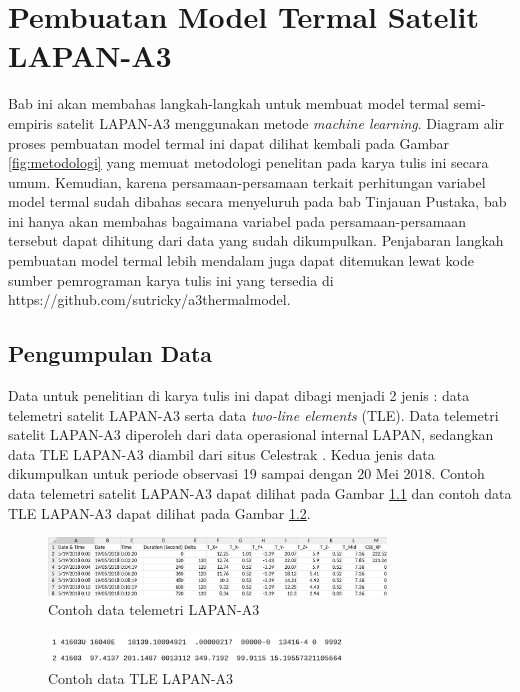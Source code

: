 \chapter{Pembuatan Model Termal Satelit LAPAN-A3}

Bab ini akan membahas langkah-langkah untuk membuat model termal semi-empiris
satelit LAPAN-A3 menggunakan metode \textit{machine learning}. Diagram alir
proses pembuatan model termal ini dapat dilihat kembali pada Gambar
\ref{fig:metodologi} yang memuat metodologi penelitan pada karya tulis ini
secara umum. Kemudian, karena persamaan-persamaan terkait perhitungan variabel
model termal sudah dibahas secara menyeluruh pada bab Tinjauan Pustaka, bab ini
hanya akan membahas bagaimana variabel pada persamaan-persamaan tersebut dapat
dihitung dari data yang sudah dikumpulkan. Penjabaran langkah pembuatan model
termal lebih mendalam juga dapat ditemukan lewat kode sumber pemrograman karya
tulis ini yang tersedia di https://github.com/sutricky/a3thermalmodel.

\section{Pengumpulan Data}

Data untuk penelitian di karya tulis ini dapat dibagi menjadi 2 jenis : data
telemetri satelit LAPAN-A3 serta data \textit{two-line elements} (TLE). Data
telemetri satelit LAPAN-A3 diperoleh dari data operasional internal LAPAN,
sedangkan data TLE LAPAN-A3 diambil dari situs Celestrak \cite{kelso}. Kedua
jenis data dikumpulkan untuk periode observasi 19 sampai dengan 20 Mei 2018.
Contoh data telemetri satelit LAPAN-A3 dapat dilihat pada Gambar
\ref{fig:telea3} dan contoh data TLE LAPAN-A3 dapat dilihat pada Gambar
\ref{fig:tlea3}.

\begin{figure}[H]
\setlength{}
\begin{center}
\includegraphics[width=0.8\textwidth]{fig/telea3.png}
\caption{Contoh data telemetri LAPAN-A3}
\label{fig:telea3}
\end{center}
\end{figure}

\begin{figure}[H]
\setlength{}
\begin{center}
\includegraphics[width=0.7\textwidth]{fig/tlea3.png}
\caption{Contoh data TLE LAPAN-A3}
\label{fig:tlea3}
\end{center}
\end{figure}

